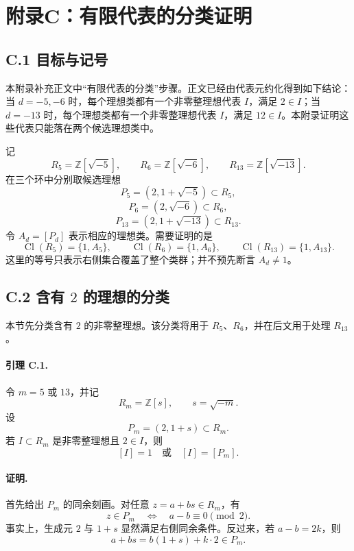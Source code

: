 \newpage
{}
\section*{附录C：有限代表的分类证明}
\begingroup
\setlength{\parindent}{0pt}
\setlength{\parskip}{0.35\baselineskip}

\subsection*{C.1 目标与记号}

本附录补充正文中“有限代表的分类”步骤。正文已经由代表元约化得到如下结论：当
\(d=-5,-6\) 时，每个理想类都有一个非零整理想代表 \(I\)，满足 \(2\in I\)；当
\(d=-13\) 时，每个理想类都有一个非零整理想代表 \(I\)，满足 \(12\in I\)。本附录证明这些代表只能落在两个候选理想类中。

记
\[
R_5=\mathbb Z[\sqrt{-5}],\qquad
R_6=\mathbb Z[\sqrt{-6}],\qquad
R_{13}=\mathbb Z[\sqrt{-13}].
\]
在三个环中分别取候选理想
\[
P_5=(2,1+\sqrt{-5})\subset R_5,
\]
\[
P_6=(2,\sqrt{-6})\subset R_6,
\]
\[
P_{13}=(2,1+\sqrt{-13})\subset R_{13}.
\]
令 \(A_d=[P_d]\) 表示相应的理想类。需要证明的是
\[
\operatorname{Cl}(R_5)=\{1,A_5\},\qquad
\operatorname{Cl}(R_6)=\{1,A_6\},\qquad
\operatorname{Cl}(R_{13})=\{1,A_{13}\}.
\]
这里的等号只表示右侧集合覆盖了整个类群；并不预先断言 \(A_d\ne1\)。

\subsection*{C.2 含有 \(2\) 的理想的分类}

本节先分类含有 \(2\) 的非零整理想。该分类将用于
\(R_5\)、\(R_6\)，并在后文用于处理 \(R_{13}\)。

\paragraph{引理 C.1.}
令 \(m=5\) 或 \(13\)，并记
\[
R_m=\mathbb Z[s],\qquad s=\sqrt{-m}.
\]
设
\[
P_m=(2,1+s)\subset R_m.
\]
若 \(I\subset R_m\) 是非零整理想且 \(2\in I\)，则
\[
[I]=1\quad\text{或}\quad [I]=[P_m].
\]

\paragraph{证明.}
首先给出 \(P_m\) 的同余刻画。对任意
\(z=a+bs\in R_m\)，有
\[
z\in P_m
\quad\Longleftrightarrow\quad
 a-b\equiv0\pmod 2.
\]
事实上，生成元 \(2\) 与 \(1+s\) 显然满足右侧同余条件。反过来，若
\(a-b=2k\)，则
\[
a+bs=b(1+s)+k\cdot2\in P_m.
\]


